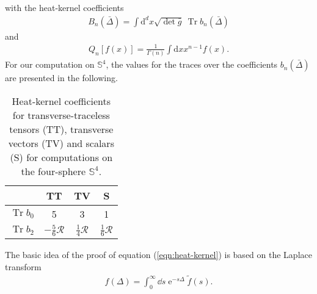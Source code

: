 with the heat-kernel coefficients 
\begin{align}
	B_{n}(\bar{\Delta})=\int \mathrm{d}^{d} x \sqrt{\operatorname{det}\bar{g}} \  \operatorname{Tr} b_{n}(\bar{\Delta})
\end{align}
and 
\begin{align}
	Q_{n}[f(x)]=\frac{1}{\Gamma(n)} \int \mathrm{d} x x^{n-1} f(x).
\end{align}
For our computation on $\mathbb{S}^4$, the values for the traces over the coefficients $b_n(\bar{\Delta})$ are presented in the following.
\begin{table}[H]
	\centering
	\setlength{\tabcolsep}{5mm}
	\setlength\extrarowheight{2mm}
	\begin{tabular}{c | c c c}
	   & TT & TV & S\\ \hline
	   $\operatorname{Tr} b_{0}$ & 5 &  3 & 1\\
	  $\operatorname{Tr} b_{2}$ & $-\frac{5}{6}\mathcal{R}$ & $\frac{1}{4}\mathcal{R}$& $\frac{1}{6}\mathcal{R}$\\
	\end{tabular}
	\caption{Heat-kernel coefficients for transverse-traceless tensors (TT), transverse vectors (TV) and scalars (S) for computations on the four-sphere $\mathbb{S}^4$.}
\end{table}

The basic idea of the proof of equation (\ref{eqn:heat-kernel}) is based on the Laplace transform
\begin{align}
	f(\Delta) = \int_0^{\infty} \dd s \operatorname{e}^{-s\Delta}\tilde{f}(s).
\end{align}


